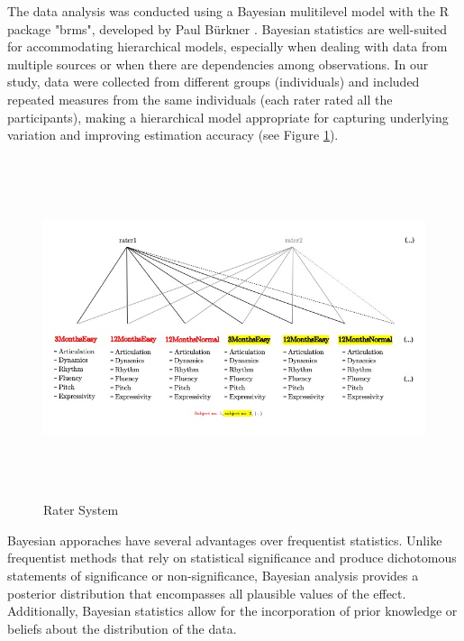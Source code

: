 
The data analysis was conducted using a Bayesian mulitilevel model with the R package "brms", developed by Paul Bürkner  \cite{Burkner2017, Burkner2018}. Bayesian statistics are well-suited for accommodating hierarchical models, especially when dealing with data from multiple sources or when there are dependencies among observations. In our study, data were collected from different groups (individuals) and included repeated measures from the same individuals (each rater rated all the participants), making a hierarchical model appropriate for capturing underlying variation and improving estimation accuracy (see Figure \ref{fig:rater}). 

\begin{figure}[h]
	\centering
	\includegraphics[width=15cm,height=10cm,keepaspectratio]{Rater}
	\caption{Rater System}
	\label{fig:rater}
\end{figure}


Bayesian apporaches have several advantages over frequentist statistics. Unlike frequentist methods that rely on statistical significance and produce dichotomous statements of significance or non-significance, Bayesian analysis provides a posterior distribution that encompasses all plausible values of the effect. Additionally, Bayesian statistics allow for the incorporation of prior knowledge or beliefs about the distribution of the data. 

